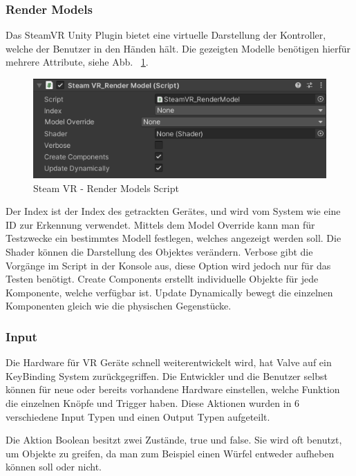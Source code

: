 \begin{itemize}
\subsubsection{Render Models}
Das SteamVR Unity Plugin bietet eine virtuelle Darstellung der Kontroller, welche der Benutzer in den Händen hält.
Die gezeigten Modelle benötigen hierfür mehrere Attribute, siehe Abb. ~\ref{fig:steamvr_render_models Script}.
\begin {figure}
    \centering
    \includegraphics[scale=1]{pics/steamVR_render_models_script}
    \caption{Steam VR - Render Models Script}
    \label{fig:steamvr_render_models Script}
\end {figure}
Der Index ist der Index des getrackten Gerätes, und wird vom System wie eine ID zur Erkennung verwendet.
Mittels dem Model Override kann man für Testzwecke ein bestimmtes Modell festlegen, welches angezeigt werden soll.
Die Shader können die Darstellung des Objektes verändern.
Verbose gibt die Vorgänge im Script in der Konsole aus, diese Option wird jedoch nur für das Testen benötigt.
Create Components erstellt individuelle Objekte für jede Komponente, welche verfügbar ist.
Update Dynamically bewegt die einzelnen Komponenten gleich wie die physischen Gegenstücke.
~\cite{SteamVR_Render_Models_2022}

\subsubsection{Input}
Die Hardware für VR Geräte schnell weiterentwickelt wird, hat Valve auf ein KeyBinding System zurückgegriffen.
Die Entwickler und die Benutzer selbst können für neue oder bereits vorhandene Hardware einstellen, welche Funktion die einzelnen Knöpfe und Trigger haben.
Diese Aktionen wurden in 6 verschiedene Input Typen und einen Output Typen aufgeteilt.

Die Aktion Boolean besitzt zwei Zustände, true und false.
Sie wird oft benutzt, um Objekte zu greifen, da man zum Beispiel einen Würfel entweder aufheben können soll oder nicht.


\end{itemize}
